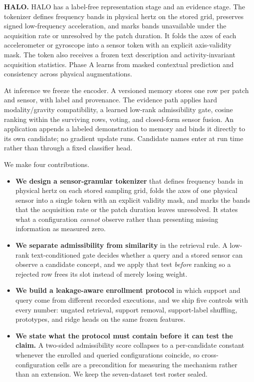 \textbf{HALO.} HALO has a label-free representation stage and an evidence stage. The tokenizer
defines frequency bands in physical hertz on the stored grid, preserves signed low-frequency
acceleration, and marks bands unavailable under the acquisition rate or unresolved by the patch
duration. It folds the axes of each accelerometer or gyroscope into a sensor token with an explicit
axis-validity mask. The token also receives a frozen text description and activity-invariant
acquisition statistics. Phase A learns from masked contextual prediction and consistency across
physical augmentations.

At inference we freeze the encoder. A versioned memory stores one row per patch and sensor, with
label and provenance. The evidence path applies hard modality/gravity compatibility, a learned
low-rank admissibility gate, cosine ranking within the surviving rows, voting, and closed-form
sensor fusion. An application appends a labeled demonstration to memory and binds it directly to its
own candidate; no gradient update runs. Candidate names enter at run time rather than through a
fixed classifier head.

We make four contributions.

\begin{itemize}
  \item \textbf{We design a sensor-granular tokenizer} that defines frequency bands in physical
        hertz on each stored sampling grid, folds the axes of one physical sensor into a single
        token with an explicit validity mask, and marks the bands that the acquisition rate or the
        patch duration leaves unresolved. It states what a configuration \emph{cannot} observe
        rather than presenting missing information as measured zero.
  \item \textbf{We separate admissibility from similarity} in the retrieval rule. A low-rank
        text-conditioned gate decides whether a query and a stored sensor can observe a candidate
        concept, and we apply that test \emph{before} ranking so a rejected row frees its slot
        instead of merely losing weight.
  \item \textbf{We build a leakage-aware enrollment protocol} in which support and query come from
        different recorded executions, and we ship five controls with every number: ungated
        retrieval, support removal, support-label shuffling, prototypes, and ridge heads on the same
        frozen features.
  \item \textbf{We state what the protocol must contain before it can test the claim.} A two-sided
        admissibility score collapses to a per-candidate constant whenever the enrolled and queried
        configurations coincide, so cross-configuration cells are a precondition for measuring the
        mechanism rather than an extension. We keep the seven-dataset test roster sealed.
\end{itemize}
